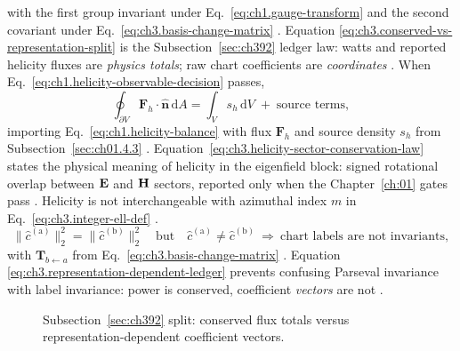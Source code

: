 with the first group invariant under Eq.~\eqref{eq:ch1.gauge-transform} and the second covariant under
Eq.~\eqref{eq:ch3.basis-change-matrix} \cite{poynting1884}. Equation
\eqref{eq:ch3.conserved-vs-representation-split} is the Subsection~\ref{sec:ch392} ledger law: watts and reported helicity fluxes are
\emph{physics totals}; raw chart coefficients are \emph{coordinates} \cite{stratton1941}.
When Eq.~\eqref{eq:ch1.helicity-observable-decision} passes,
\begin{equation}
\label{eq:ch3.helicity-sector-conservation-law}
\oint_{\partial V} \mathbf{F}_{h}\cdot\hat{\mathbf{n}}\,\mathrm{d}A
=
\int_{V} s_{h}\,\mathrm{d}V
\;+\;
\text{source terms},
\end{equation}
importing Eq.~\eqref{eq:ch1.helicity-balance} with flux \(\mathbf{F}_{h}\) and source density \(s_{h}\) from Subsection~\ref{sec:ch01.4.3}
\cite{belinfante1940}. Equation~\eqref{eq:ch3.helicity-sector-conservation-law} states the physical meaning of helicity in the
eigenfield block: signed rotational overlap between \(\mathbf{E}\) and \(\mathbf{H}\) sectors, reported only when the Chapter~\ref{ch:01} gates pass
\cite{harrington2001}. Helicity is not interchangeable with azimuthal index \(m\) in
Eq.~\eqref{eq:ch3.integer-ell-def} \cite{hansen1988}.
\begin{equation}
\label{eq:ch3.representation-dependent-ledger}
\|\widehat{c}^{(\mathrm{a})}\|_{2}^{2}
=
\|\widehat{c}^{(\mathrm{b})}\|_{2}^{2}
\quad\text{but}\quad
\widehat{c}^{(\mathrm{a})}\neq \widehat{c}^{(\mathrm{b})}
\ \Longrightarrow\
\text{chart labels are not invariants},
\end{equation}
with \(\mathbf{T}_{b\leftarrow a}\) from Eq.~\eqref{eq:ch3.basis-change-matrix} \cite{hansen1988}. Equation
\eqref{eq:ch3.representation-dependent-ledger} prevents confusing Parseval invariance with label invariance: power is conserved, coefficient
\emph{vectors} are not \cite{poynting1884}.
\begin{figure}[t]
\centering
{}
\caption{Subsection~\ref{sec:ch392} split: conserved flux totals versus representation-dependent coefficient vectors.}
\label{fig:ch3.392-conserved-split}
\end{figure}
